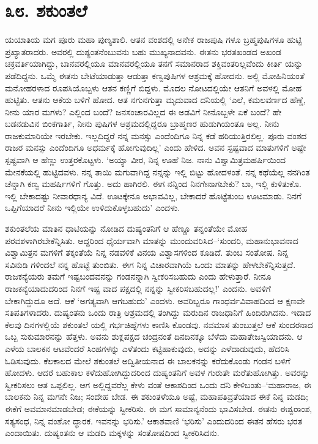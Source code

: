 
\chapter{೩೮. ಶಕುಂತಲೆ}

ಯಯಾತಿಯ ಮಗ ಪೂರು ಮಹಾ ಪುಣ್ಯಶಾಲಿ. ಆತನ ವಂಶದಲ್ಲಿ ಅನೇಕ ರಾಜಪುಷಿ ಗಳೂ ಬ್ರಹ್ಮಪುಷಿಗಳೂ ಹುಟ್ಟಿ ಪ್ರಖ್ಯಾತರಾದರು. ಅವರಲ್ಲಿ ದುಶ್ಯಂತನೆಂಬುವನು ಬಹು ಮುಖ್ಯನಾದವನು. ಈತನು ಭರತಖಂಡದ ಅಖಂಡ ಚಕ್ರವರ್ತಿಯಾಗಿದ್ದು, ಬಾನವರಲ್ಲಿಯೂ ಮಾನವರಲ್ಲಿಯೂ ತನಗೆ ಸಮಾನರಾದ ಶಕ್ತಿವಂತರಿಲ್ಲವೆಂದು ಕೀರ್ತಿ ಯನ್ನು ಪಡೆದಿದ್ದನು. ಒಮ್ಮೆ ಈತನು ಬೇಟೆಯಾಡುತ್ತಾ ಆಡುತ್ತಾ ಕಣ್ವಪುಷಿಗಳ ಆಶ್ರಮಕ್ಕೆ ಹೋದನು. ಅಲ್ಲಿ ಮೋಹಿನಿಯಂತೆ ಮನೋಹರಳಾದ ರೂಪಸಿಯೊಬ್ಬಳು ಆತನ ಕಣ್ಣಿಗೆ ಬಿದ್ದಳು. ಮೊದಲ ನೋಟದಲ್ಲಿಯೇ ಆತನಿಗೆ ಅವಳಲ್ಲಿ ಮೋಹ ಹುಟ್ಟಿತು. ಆತನು ಆಕೆಯ ಬಳಿಗೆ ಹೋದ. ಆತ ನಗುನಗುತ್ತಾ ಮೃದುವಾದ ದನಿಯಲ್ಲಿ ‘ಎಲೆ, ಕಮಲವರ್ಣದ ಹೆಣ್ಣೆ, ನೀನು ಯಾರ ಮಗಳು? ಎಲ್ಲಿಂದ ಬಂದೆ? ಜನಸಂಚಾರವಿಲ್ಲದ ಈ ಅಡವಿಗೆ ನೀನೊಬ್ಬಳೇ ಏಕೆ ಬಂದೆ? ಹೇ ಬಡನಡುವಿನ ಬಿಂಕಗಾರ್ತಿ, ನೀನು ಪುಷಿಗಳ ಆಶ್ರಮದಲ್ಲಿದ್ದರೂ ಬ್ರಾಹ್ಮಣರ ಹುಡುಗಿಯಂತೂ ಅಲ್ಲ. ನೀನು ರಾಜಕುಮಾರಿಯೇ ಇರಬೇಕು. ಇಲ್ಲದಿದ್ದರೆ ನನ್ನ ಮನಸ್ಸು ಎಂದೆಂದಿಗೂ ನಿನ್ನ ಕಡೆ ಹರಿಯುತ್ತಿರಲಿಲ್ಲ. ಪೂರು ವಂಶದ ರಾಜರ ಮನಸ್ಸು ಎಂದೆಂದಿಗೂ ಅಧರ್ಮಕ್ಕೆ ಹೋಗುವುದಿಲ್ಲ’ ಎಂದು ಹೇಳಿದ. ಅವನ ಸ್ಪಷ್ಟವಾದ ಮಾತುಗಳಿಗೆ ಅಷ್ಟೇ ಸ್ಪಷ್ಟವಾಗಿ ಆ ಹೆಣ್ಣು ಉತ್ತರಕೊಟ್ಟಳು. ‘ಅಯ್ಯಾ ವೀರ, ನಿನ್ನ ಊಹೆ ನಿಜ. ನಾನು ವಿಶ್ವಾಮಿತ್ರಮಹರ್ಷಿಯಿಂದ ಮೇನಕೆಯಲ್ಲಿ ಹುಟ್ಟಿದವಳು. ನನ್ನ ತಾಯಿ ಮಗುವಾಗಿದ್ದ ನನ್ನನ್ನು ಇಲ್ಲಿ ಬಿಟ್ಟು ಹೋದಳಂತೆ. ನನ್ನ ಕಥೆಯೆಲ್ಲ ನನಗಿಂತ ಚೆನ್ನಾಗಿ ಕಣ್ವ ಮಹರ್ಷಿಗಳಿಗೆ ಗೊತ್ತು. ಅದು ಹಾಗಿರಲಿ. ಈಗ ನನ್ನಿಂದ ನಿನಗೇನಾಗಬೇಕು? ಬಾ, ಇಲ್ಲಿ ಕುಳಿತುಕೊ. ಇಲ್ಲಿ ಬೇಕಾದಷ್ಟು ನೀವಾರಧಾನ್ಯ ವಿದೆ. ಊಟಕ್ಕೇನೂ ಅಭಾವವಿಲ್ಲ, ಬೇಕಾದರೆ ಹೊಟ್ಟೆತುಂಬ ಊಟಮಾಡು. ನಿನಗೆ ಒಪ್ಪಿಗೆಯಾದರೆ ನೀನು ಇಲ್ಲಿಯೇ ಉಳಿದುಕೊಳ್ಳಬಹುದು’ ಎಂದಳು.

ಶಕುಂತಲೆಯ ಮಾತಿನ ಧಾಟಿಯನ್ನು ನೋಡಿದ ದುಷ್ಯಂತನಿಗೆ ಆ ಹೆಣ್ಣೂ ತನ್ನಂತೆಯೇ ಮೋಹ ಪರವಶಳಾಗಿರಬೇಕೆನ್ನಿಸಿತು. ಆದ್ದರಿಂದ ಧೈರ್ಯವಾಗಿ ಮಾತನ್ನು ಮುಂದುವರಿಸಿದ–‘ಸುಂದರಿ, ಮಹಾನುಭಾವನಾದ ವಿಶ್ವಾಮಿತ್ರನ ಮಗಳಿಗೆ ತಕ್ಕಂತೆಯೆ ನಿನ್ನ ನಡವಳಿಕೆ ವಿನಯ ವಿಶ್ವಾಸಗಳಿಂದ ಕೂಡಿದೆ. ತುಂಬ ಸಂತೋಷ. ನಿನ್ನ ಸವಿನುಡಿ ಗಳಿಂದಲೆ ನನ್ನ ಹೊಟ್ಟೆ ತುಂಬಿತು. ಈಗ ನಿನ್ನ ವಿಚಾರವಾಗಿಯೆ ಒಂದು ಮಾತನ್ನು ಹೇಳಬೇಕೆನ್ನಿಸುತ್ತದೆ. ರಾಜಕನ್ಯೆಯರು ತಮಗೆ ಇಷ್ಟಬಂದವನನ್ನು ಗಂಡನನ್ನಾಗಿ ಸ್ವೀಕರಿಸಬಹುದು ಎಂದು ಹೇಳುತ್ತಾರೆ. ನೀನೂ ರಾಜಕನ್ಯೆಯಾದುದರಿಂದ ನಿನಗೆ ಇಷ್ಟ ವಾದ ಪಕ್ಷದಲ್ಲಿ ನನ್ನನ್ನು ಸ್ವೀಕರಿಸಬಹುದಲ್ಲ!’ ಎಂದನು. ಅವಳಿಗೆ ಬೇಕಾಗಿದ್ದುದೂ ಅದೆ. ಆಕೆ ‘ಅಗತ್ಯವಾಗಿ ಆಗಬಹುದು’ ಎಂದಳು. ಅವರಿಬ್ಬರೂ ಗಾಂಧರ್ವವಿವಾಹದಿಂದ ಆ ಕ್ಷಣವೇ ಸತಿಪತಿಗಳಾದರು. ದುಷ್ಯಂತನು ಒಂದು ರಾತ್ರಿ ಆಶ್ರಮದಲ್ಲಿ ತಂಗಿದ್ದು ಮರುದಿನ ರಾಜಧಾನಿಗೆ ಹಿಂದಿರುಗಿದನು. ಇದಾದ ಕೆಲವು ದಿನಗಳಲ್ಲಿಯೆ ಶಕುಂತಲೆ ಯಲ್ಲಿ ಗರ್ಭಚಿಹ್ನೆಗಳು ಕಾಣಿಸಿ ಕೊಂಡವು. ನವಮಾಸ ತುಂಬುತ್ತಲೆ ಆಕೆ ಸುಂದರನಾದ ಒಬ್ಬ ಸುಕುಮಾರನನ್ನು ಹೆತ್ತಳು. ಅವನು ಶುಕ್ಲಪಕ್ಷದ ಚಂದ್ರನಂತೆ ದಿನದಿನಕ್ಕೂ ಬೆಳೆದು ಮಹಾತೇಜಸ್ವಿಯಾದನು. ಆ ಎಳೆಯ ಬಾಲಕನ ಆಟವೆಂದರೆ ಸಿಂಹಗಳನ್ನು ಎಳೆತಂದು ಕಟ್ಟಿಹಾಕುವುದು, ಅದನ್ನು ಎಳೆದಾಡುವುದು, ಹೆದರಿಸಿ ಓಡಿಸುವುದು. ಕೆಲಕಾಲದ ಮೇಲೆ ಶಕುಂತಲೆ ಅದ್ವಿತೀಯನಾದ ಈ ಬಾಲಕನನ್ನು ಕರೆದುಕೊಂಡು ಗಂಡನ ಬಳಿಗೆ ಹೋದಳು. ಆದರೆ ಬಹುಕಾಲ ಕಳೆದುಹೋಗಿದ್ದುದರಿಂದ ದುಷ್ಯಂತನಿಗೆ ಅವಳ ಗುರುತೇ ಮರೆತುಹೋಗಿತ್ತು. ಅವರನ್ನು ಸ್ವೀಕರಿಸಲು ಆತ ಒಪ್ಪಲಿಲ್ಲ. ಆಗ ಅಲ್ಲಿದ್ದವರೆಲ್ಲ ಕೇಳು ವಂತೆ ಆಕಾಶದಿಂದ ಒಂದು ದನಿ ಕೇಳಿಬಂತು–‘ಮಹಾರಾಜ, ಈ ಬಾಲಕನು ನಿನ್ನ ಮಗನೇ ನಿಜ; ಸಂದೇಹ ಬೇಡ. ಈ ಶಕುಂತಳೆಯೂ ಅಷ್ಟೆ, ಮಹಾಪತಿವ್ರತೆಯಾದ ಈಕೆ ನಿನ್ನ ಮಡದಿ; ಈಕೆಗೆ ಅವಮಾನಮಾಡಬೇಡ; ಈಕೆಯನ್ನು ಸ್ವೀಕರಿಸು. ಈ ಮಗ ಸಾಮಾನ್ಯನೆಂದು ಭಾವಿಸಬೇಡ. ಈತನು ಈಶ್ವರಾಂಶ, ಸತ್ಯಸಂಧ, ನಿನ್ನ ವಂಶೋ ದ್ಧಾರಕ. ಇವನನ್ನು ಭರಿಸು.’ ಆಕಾಶವಾಣಿ ‘ಭರಿಸು’ ಎಂದುದರಿಂದ ಈತನ ಹೆಸರು ಭರತ ಎಂದಾಯಿತು. ದುಷ್ಯಂತನು ಆ ಮಡದಿ ಮಕ್ಕಳನ್ನು ಸಂತೋಷದಿಂದ ಸ್ವೀಕರಿಸಿದನು.

